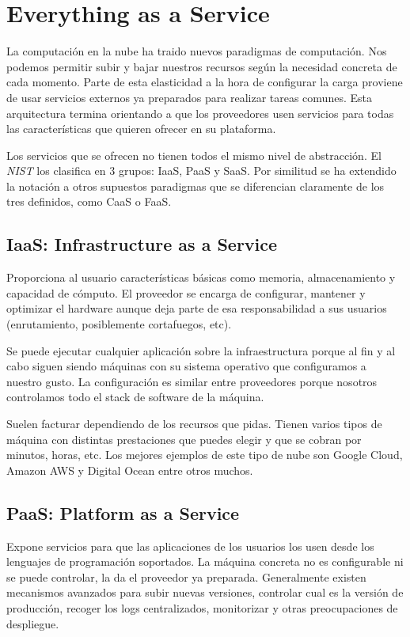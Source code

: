 \chapter{Everything as a Service}
\label{chap:everything-as-a-service}

La computación en la nube ha traido nuevos paradigmas de computación. Nos podemos permitir subir y bajar nuestros recursos según la necesidad concreta de cada momento. Parte de esta elasticidad a la hora de configurar la carga proviene de usar servicios externos ya preparados para realizar tareas comunes. Esta arquitectura termina orientando a que los proveedores usen servicios para todas las características que quieren ofrecer en su plataforma\cite{antonopoulos2010handbook}.

Los servicios que se ofrecen no tienen todos el mismo nivel de abstracción. El \emph{NIST} los clasifica\cite{petermelltimothygrance2011} en 3 grupos: IaaS, PaaS y SaaS. Por similitud se ha extendido la notación a otros supuestos paradigmas que se diferencian claramente de los tres definidos, como CaaS o FaaS.

\section{IaaS: Infrastructure as a Service}

Proporciona al usuario características básicas como memoria, almacenamiento y capacidad de cómputo. El proveedor se encarga de configurar, mantener y optimizar el hardware aunque deja parte de esa responsabilidad a sus usuarios (enrutamiento, posiblemente cortafuegos, etc).

Se puede ejecutar cualquier aplicación sobre la infraestructura porque al fin y al cabo siguen siendo máquinas con su sistema operativo que configuramos a nuestro gusto. La configuración es similar entre proveedores porque nosotros controlamos todo el stack de software de la máquina.

Suelen facturar dependiendo de los recursos que pidas. Tienen varios tipos de máquina con distintas prestaciones que puedes elegir y que se cobran por minutos, horas, etc. Los mejores ejemplos de este tipo de nube son Google Cloud, Amazon AWS y Digital Ocean entre otros muchos.

\section{PaaS: Platform as a Service}

Expone servicios para que las aplicaciones de los usuarios los usen desde los lenguajes de programación soportados. La máquina concreta no es configurable ni se puede controlar, la da el proveedor ya preparada. Generalmente existen mecanismos avanzados para subir nuevas versiones, controlar cual es la versión de producción, recoger los logs centralizados, monitorizar y otras preocupaciones de despliegue.

